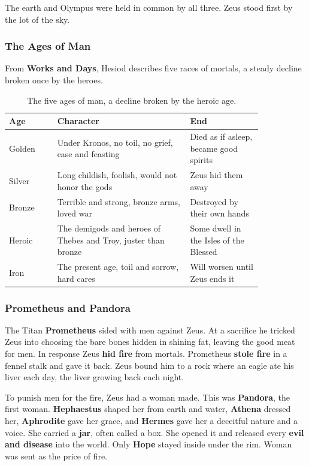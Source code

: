 The earth and Olympus were held in common by all three. Zeus stood first by the
lot of the sky.

\subsubsection{The Ages of Man}

From \textbf{Works and Days}, Hesiod describes five races of mortals, a steady
decline broken once by the heroes.

\begin{longtable}{L{0.16\linewidth} L{0.44\linewidth} L{0.24\linewidth}}
\caption{The five ages of man, a decline broken by the heroic age.}\\
\toprule
\textbf{Age} & \textbf{Character} & \textbf{End} \\
\midrule
Golden & Under Kronos, no toil, no grief, ease and feasting & Died as if asleep, became good spirits \\
Silver & Long childish, foolish, would not honor the gods & Zeus hid them away \\
Bronze & Terrible and strong, bronze arms, loved war & Destroyed by their own hands \\
Heroic & The demigods and heroes of Thebes and Troy, juster than bronze & Some dwell in the Isles of the Blessed \\
Iron & The present age, toil and sorrow, hard cares & Will worsen until Zeus ends it \\
\bottomrule
\end{longtable}

\subsubsection{Prometheus and Pandora}

The Titan \textbf{Prometheus} sided with men against Zeus. At a sacrifice he
tricked Zeus into choosing the bare bones hidden in shining fat, leaving the good
meat for men. In response Zeus \textbf{hid fire} from mortals. Prometheus
\textbf{stole fire} in a fennel stalk and gave it back. Zeus bound him to a rock
where an eagle ate his liver each day, the liver growing back each night.

To punish men for the fire, Zeus had a woman made. This was \textbf{Pandora}, the
first woman. \textbf{Hephaestus} shaped her from earth and water, \textbf{Athena}
dressed her, \textbf{Aphrodite} gave her grace, and \textbf{Hermes} gave her a
deceitful nature and a voice. She carried a \textbf{jar}, often called a box. She
opened it and released every \textbf{evil and disease} into the world. Only
\textbf{Hope} stayed inside under the rim. Woman was sent as the price of fire.

